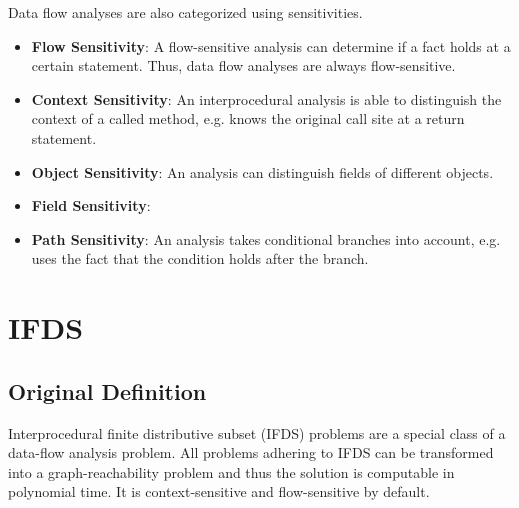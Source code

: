 \documentclass[../draft.tex]{subfiles}
\begin{document}



    Data flow analyses are also categorized using sensitivities. 
    \begin{itemize}
        \item \textbf{Flow Sensitivity}: A flow-sensitive analysis can determine if a fact holds at a certain statement. Thus, data flow analyses are always flow-sensitive.
        \item \textbf{Context Sensitivity}: An interprocedural analysis is able to distinguish the context of a called method, e.g. knows the original call site at a return statement.
        \item \textbf{Object Sensitivity}: An analysis can distinguish fields of different objects.
        \item \textbf{Field Sensitivity}:
        \item \textbf{Path Sensitivity}: An analysis takes conditional branches into account, e.g. uses the fact that the condition holds after the branch.
    \end{itemize}

    \section{IFDS}
    \subsection{Original Definition}
    Interprocedural finite distributive subset (IFDS) problems are a special class of a data-flow analysis problem. All problems adhering to IFDS can be transformed into a graph-reachability problem and thus the solution is computable in polynomial time. It is context-sensitive and flow-sensitive by default.
\end{document}
